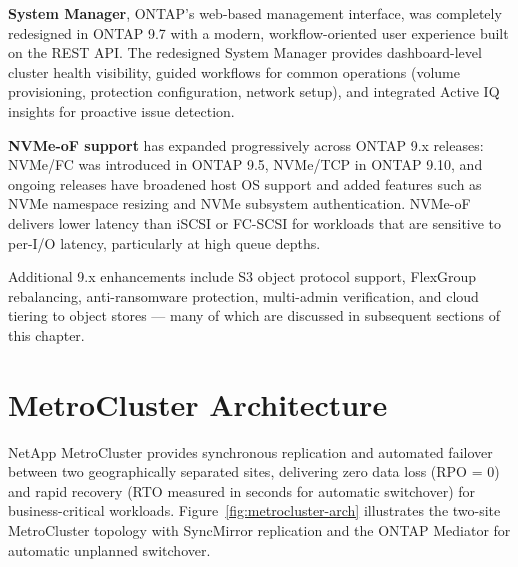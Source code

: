 \textbf{System Manager}, ONTAP's web-based management interface, was completely redesigned in ONTAP 9.7 with a modern, workflow-oriented user experience built on the REST API. The redesigned System Manager provides dashboard-level cluster health visibility, guided workflows for common operations (volume provisioning, protection configuration, network setup), and integrated Active IQ insights for proactive issue detection.

\textbf{NVMe-oF support} has expanded progressively across ONTAP 9.x releases: NVMe/FC was introduced in ONTAP 9.5, NVMe/TCP in ONTAP 9.10, and ongoing releases have broadened host OS support and added features such as NVMe namespace resizing and NVMe subsystem authentication. NVMe-oF delivers lower latency than iSCSI or FC-SCSI for workloads that are sensitive to per-I/O latency, particularly at high queue depths.

Additional 9.x enhancements include S3 object protocol support, FlexGroup rebalancing, anti-ransomware protection, multi-admin verification, and cloud tiering to object stores --- many of which are discussed in subsequent sections of this chapter.

\section{MetroCluster Architecture}

NetApp MetroCluster provides synchronous replication and automated failover between two geographically separated sites, delivering zero data loss (RPO = 0) and rapid recovery (RTO measured in seconds for automatic switchover) for business-critical workloads. Figure~\ref{fig:metrocluster-arch} illustrates the two-site MetroCluster topology with SyncMirror replication and the ONTAP Mediator for automatic unplanned switchover.

